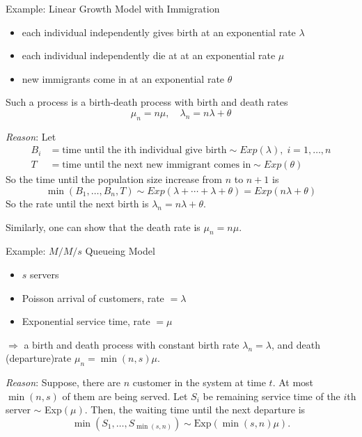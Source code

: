 \documentclass[letterpaper,handout, mathserif]{beamer}
\begin{document}
\begin{frame}{Example: Linear Growth Model with Immigration}
\begin{itemize}
\item each individual independently gives birth at an exponential rate $\lambda$
\item each individual independently die at at an exponential rate $\mu$
\item new immigrants come in at an exponential rate $\theta$
\end{itemize}
Such a process is a birth-death process with birth and death rates
$$\mu_n=n\mu,\quad \lambda_n=n\lambda+\theta$$

\vspace{-6pt}\textit{Reason}: Let
\begin{align*}
B_i &= \text{time until the ith individual give birth}\sim Exp(\lambda),\; i=1,\ldots,n\\
T &=\text{time until the next new immigrant comes in}\sim Exp(\theta)
\end{align*}
So the time until the population size increase from $n$ to $n+1$ is
$$
\min(B_1,\ldots,B_n, T) \sim Exp(\lambda+\cdots+\lambda+\theta)=Exp(n\lambda+\theta)
$$
So the rate until the next birth is $\lambda_n=n\lambda+\theta$.\par\smallskip

Similarly, one can show that the death rate is $\mu_n=n\mu$.

\end{frame}
\begin{frame}{Example: $M/M/s$ Queueing Model}
\begin{itemize}
\item $s$ servers
\item Poisson arrival of customers, rate $=\lambda$
\item Exponential service time,  rate $=\mu$
\end{itemize}
$\Rightarrow$ a birth and death process with constant birth rate $\lambda_n=\lambda$, and death (departure)rate $\mu_n = \min(n,s)\mu.$\medskip\pause

\textit{Reason}:
Suppose, there are $n$ customer in the system at time $t$.
At most $\min(n,s)$ of them are being served. Let 
$S_i$ be remaining service time of the $i$th server $\sim$ Exp$(\mu).$
Then, the waiting time until the next departure is 
$$
\min(S_1, \ldots, S_{\min(s,n)})\sim \text{Exp}(\min(s,n)\mu).
$$
\end{frame}
\end{document}
